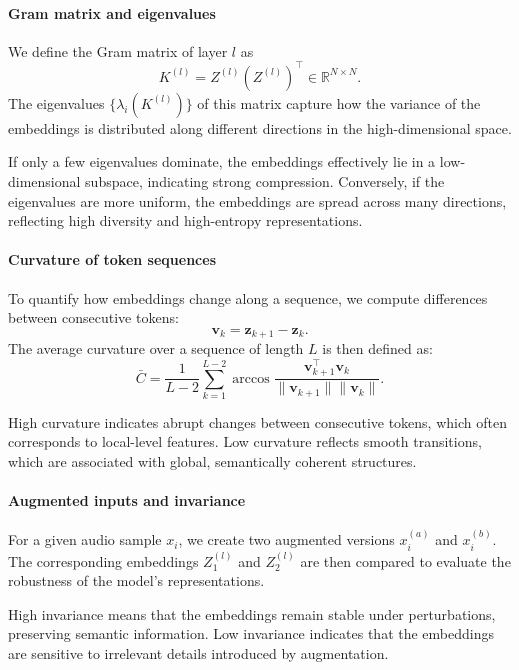 \documentclass[5p]{elsarticle}
\begin{document}
\paragraph{Gram matrix and eigenvalues} 
We define the Gram matrix of layer $l$ as
\[
K^{(l)} = Z^{(l)} (Z^{(l)})^\top \in \mathbb{R}^{N \times N}.
\] 
The eigenvalues $\{\lambda_i(K^{(l)})\}$ of this matrix capture how the variance of the embeddings is distributed along different directions in the high-dimensional space.

\begin{tcolorbox}[colback=gray!10,colframe=black!50,title=Intuition]
If only a few eigenvalues dominate, the embeddings effectively lie in a low-dimensional subspace, indicating strong compression.  
Conversely, if the eigenvalues are more uniform, the embeddings are spread across many directions, reflecting high diversity and high-entropy representations.
\end{tcolorbox}

\paragraph{Curvature of token sequences} 
To quantify how embeddings change along a sequence, we compute differences between consecutive tokens: 
\[
\mathbf{v}_k = \mathbf{z}_{k+1} - \mathbf{z}_k.
\] 
The average curvature over a sequence of length $L$ is then defined as:
\[
\bar{C} = \frac{1}{L-2} \sum_{k=1}^{L-2} 
\arccos \frac{\mathbf{v}_{k+1}^\top \mathbf{v}_k}{\|\mathbf{v}_{k+1}\|\|\mathbf{v}_k\|}.
\]

\begin{tcolorbox}[colback=gray!10,colframe=black!50,title=Intuition]
High curvature indicates abrupt changes between consecutive tokens, which often corresponds to local-level features.  
Low curvature reflects smooth transitions, which are associated with global, semantically coherent structures.
\end{tcolorbox}

\paragraph{Augmented inputs and invariance} 
For a given audio sample $x_i$, we create two augmented versions $x_i^{(a)}$ and $x_i^{(b)}$. 
The corresponding embeddings $Z_1^{(l)}$ and $Z_2^{(l)}$ are then compared to evaluate the robustness of the model's representations.

\begin{tcolorbox}[colback=gray!10,colframe=black!50,title=Intuition]
High invariance means that the embeddings remain stable under perturbations, preserving semantic information.  
Low invariance indicates that the embeddings are sensitive to irrelevant details introduced by augmentation.
\end{tcolorbox}
\end{document}
